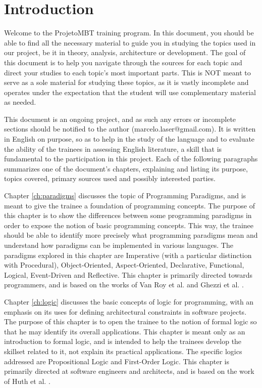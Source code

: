 \chapter*{Introduction}

Welcome to the ProjetoMBT training program. In this document, you should be able to find all the necessary material to guide you in studying the topics used in our project, be it in theory, analysis, architecture or development. The goal of this document is to help you navigate through the sources for each topic and direct your studies to each topic's most important parts. This is NOT meant to serve as a sole material for studying these topics, as it is vastly incomplete and operates under the expectation that the student will use complementary material as needed.

This document is an ongoing project, and as such any errors or incomplete sections should be notified to the author (marcelo.laser@gmail.com). It is written in English on purpose, so as to help in the study of the language and to evaluate the ability of the trainees in assessing English literature, a skill that is fundamental to the participation in this project. Each of the following paragraphs summarizes one of the document's chapters, explaining and listing its purpose, topics covered, primary sources used and possibly interested parties.

Chapter \ref{ch:paradigms} discusses the topic of Programming Paradigms, and is meant to give the trainee a foundation of programming concepts. The purpose of this chapter is to show the differences between some programming paradigms in order to expose the notion of basic programming concepts. This way, the trainee should be able to identify more precisely what programming paradigms mean and understand how paradigms can be implemented in various languages. The paradigms explored in this chapter are Imperative (with a particular distinction with Procedural), Object-Oriented, Aspect-Oriented, Declarative, Functional, Logical, Event-Driven and Reflective. This chapter is primarily directed towards programmers, and is based on the works of Van Roy et al. \cite{VANROY:2004} and Ghezzi et al. \cite{GHEZZI:1997}.

Chapter \ref{ch:logic} discusses the basic concepts of logic for programming, with an emphasis on its uses for defining architectural constraints in software projects. The purpose of this chapter is to open the trainee to the notion of formal logic so that he may identify its overall applications. This chapter is meant only as an introduction to formal logic, and is intended to help the trainees develop the skillset related to it, not explain its practical applications. The specific logics addressed are Propositional Logic and First-Order Logic. This chapter is primarily directed at software engineers and architects, and is based on the work of Huth et al. \cite{HUTH:2004}.

